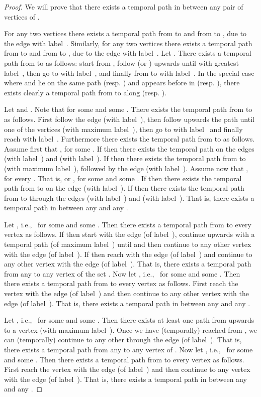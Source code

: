 \documentclass[a4paper,UKenglish]{article}
\begin{document}
\begin{proof}
We will prove that there exists a temporal path in 
between any pair of vertices of . 

For any two vertices  there exists a temporal path from  to  and from  to , due to the edge  with label~. Similarly, for any two vertices  there exists a temporal path from  to  and from  to , due to the edge  with label~. Let . There exists a temporal path from  to  as
follows: start from , follow  (or ) upwards until  with greatest label~, then go to  with label~,
and finally from  to  with label~. In the special case
where  and  lie on the same path  (resp. )
and  appears before  in  (resp. ), there
exists clearly a temporal path from  to  along 
(resp. ).

Let  and . Note that  for some  and some . There exists the temporal
path from  to  as follows. First follow the edge  (with label~), then follow upwards the path  until one of the vertices  (with maximum label~),
then go to  with label~ and finally reach  with label~.
Furthermore there exists the temporal path from  to  as follows.
Assume first that , for some . If  then there exists the temporal path on the edges  (with label~) and 
(with label~). If  then there exists the temporal
path from  to  (with maximum label~), followed
by the edge  (with label~). Assume now that , for every . That is, 
or , for some  and some . If  then there exists the temporal path from  to  on the edge  (with label~). If  then
there exists the temporal path from  to  through the edges  (with label~) and  (with label~). That
is, there exists a temporal path in  between any 
and any .

Let , i.e.,~ for some  and
some . Then there exists a temporal path from  to every
vertex  as follows. If  then start with the edge  (of label~), continue upwards with a temporal
path (of maximum label~) until  and then continue to
any other vertex  with the edge  (of label~). If  then reach  with the edge  (of label~) and continue to any other vertex  with the edge  (of label~). That is, there exists
a temporal path from any  to any vertex of the set . Now let , i.e.,~ for some  and some . Then there exists a temporal path from  to every vertex  as follows. First reach the vertex  with the
edge  (of label~) and then continue to any
other vertex  with the edge  (of label~). That
is, there exists a temporal path in  between any 
and any .

Let , i.e.,~ for some 
 and some . Then there exists at
least one path from  upwards to a vertex  (with maximum label~).
Once we have (temporally) reached  from , we can (temporally) continue
to any other  through the edge  (of label~). That is, there exists a temporal path from any  to any vertex of . Now let , i.e.,~ for some  and some . Then there exists a temporal path from 
to every vertex  as follows. First reach the vertex  with the
edge  (of label~) and then continue to any vertex  with the edge  (of label~). That is, there exists a
temporal path in  between any  and any .


\end{proof}
\end{document}
